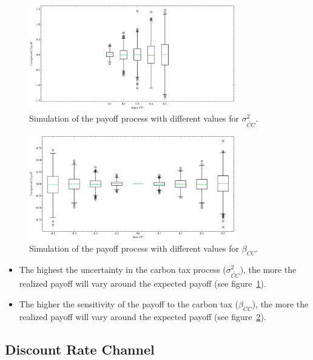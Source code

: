 \begin{figure}[htbp]
    \centering
    \includegraphics[width=0.8\textwidth]{../images/chapter01/unexpected_payoff_boxplot.png}
    \caption{Simulation of the payoff process with different values for $\sigma_{\tilde{CC}}^2$.}
    \label{fig:payoff}
\end{figure}

\begin{figure}[htbp]
    \centering
    \includegraphics[width=0.8\textwidth]{../images/chapter01/unexpected_payoff_beta_cc.png}
    \caption{Simulation of the payoff process with different values for $\beta_{CC}$.}
    \label{fig:payoff_beta}
\end{figure}



\begin{itemize}
    \item The highest the uncertainty in the carbon tax process ($\sigma_{\tilde{CC}}^2$),
    the more the realized payoff will vary around the expected payoff (see figure~\ref{fig:payoff}).
    \item The higher the sensitivity of the payoff to the carbon tax ($\beta_{CC}$),
    the more the realized payoff will vary around the expected payoff (see figure~\ref{fig:payoff_beta}).    
\end{itemize}




\subsection{Discount Rate Channel}

